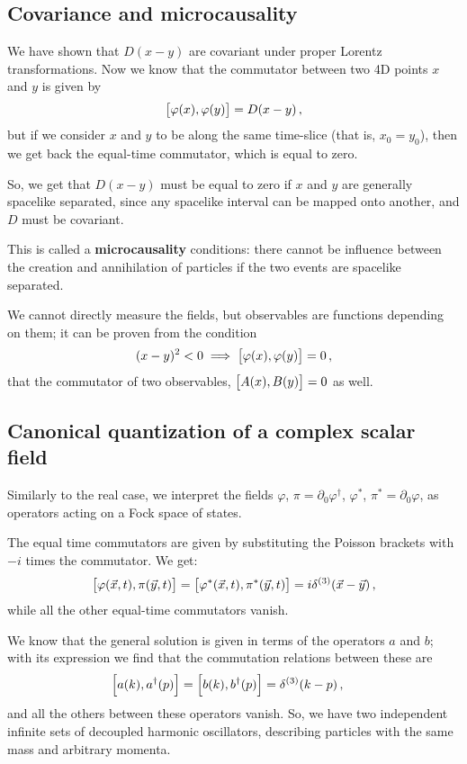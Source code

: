 \documentclass[main.tex]{subfiles}
\begin{document}
\subsection{Covariance and microcausality}

We have shown that \(D(x-y)\) are covariant under proper Lorentz transformations. Now we know that the commutator between two 4D points \(x\) and \(y\) is given by 
%
\begin{align}
\qty[\varphi (x), \varphi (y)] = D(x-y)
\,,
\end{align}
%
but if we consider \(x\) and \(y\) to be along the same time-slice (that is, \(x_0 = y_0 \)), then we get back the equal-time commutator, which is equal to zero. 

So, we get that \(D(x-y)\) must be equal to zero if \(x\) and \(y\) are generally spacelike separated, since any spacelike interval can be mapped onto another, and \(D\) must be covariant. 

This is called a \textbf{microcausality} conditions: there cannot be influence between the creation and annihilation of particles if the two events are spacelike separated. 

We cannot directly measure the fields, but observables are functions depending on them; it can be proven from the condition 
%
\begin{align}
(x-y)^2<0 \implies
\qty[\varphi (x), \varphi (y)] = 0
\,,
\end{align}
%
that the commutator of two observables, \(\qty[A(x), B(y)] =0\) as well.

\subsection{Canonical quantization of a complex scalar field}

Similarly to the real case, we interpret the fields \(\varphi \), \(\pi = \partial_0 \varphi ^\dag\), \(\varphi^{*}\), \(\pi^{*} = \partial_{0} \varphi \), as operators acting on a Fock space of states.

The equal time commutators are given by substituting the Poisson brackets with \(-i\) times the commutator. We get: 
%
\begin{align}
\qty[\varphi (\vec{x}, t), \pi (\vec{y}, t)] =
\qty[\varphi^{*} (\vec{x}, t), \pi^{*} (\vec{y}, t)] = i \delta^{(3)} (\vec{x} - \vec{y}) 
\,,
\end{align}
%
while all the other equal-time commutators vanish.

We know that the general solution  is given in terms of the operators \(a\) and \(b\); with its expression we find that the commutation relations between these are 
%
\begin{align}
\qty[a(k), a ^\dag(p)] = \qty[b(k), b ^\dag (p)] &= \delta^{(3)} (k-p)
\,,
\end{align}
%
and all the others between these operators vanish. 
So, we have two independent infinite sets of decoupled harmonic oscillators, describing particles with the same mass and arbitrary momenta. 
\end{document}
